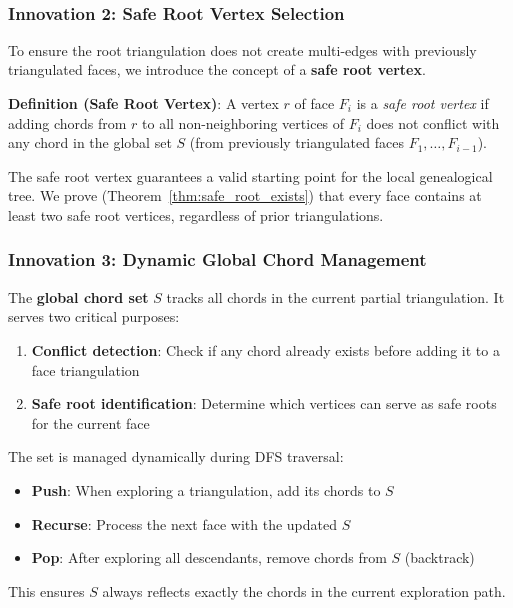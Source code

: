 ﻿﻿\documentclass[12pt,a4paper]{article}
\theoremstyle{definition}
\theoremstyle{remark}
\begin{document}
\subsubsection{Innovation 2: Safe Root Vertex Selection}

To ensure the root triangulation does not create multi-edges with previously triangulated faces, we introduce the concept of a \textbf{safe root vertex}.

\textbf{Definition (Safe Root Vertex)}: A vertex $r$ of face $F_i$ is a \textit{safe root vertex} if adding chords from $r$ to all non-neighboring vertices of $F_i$ does not conflict with any chord in the global set $S$ (from previously triangulated faces $F_1, \ldots, F_{i-1}$).

The safe root vertex guarantees a valid starting point for the local genealogical tree. We prove (Theorem~\ref{thm:safe_root_exists}) that every face contains at least two safe root vertices, regardless of prior triangulations.

\subsubsection{Innovation 3: Dynamic Global Chord Management}

The \textbf{global chord set} $S$ tracks all chords in the current partial triangulation. It serves two critical purposes:

\begin{enumerate}
	\item \textbf{Conflict detection}: Check if any chord already exists before adding it to a face triangulation
	\item \textbf{Safe root identification}: Determine which vertices can serve as safe roots for the current face
\end{enumerate}

The set is managed dynamically during DFS traversal:
\begin{itemize}
	\item \textbf{Push}: When exploring a triangulation, add its chords to $S$
	\item \textbf{Recurse}: Process the next face with the updated $S$
	\item \textbf{Pop}: After exploring all descendants, remove chords from $S$ (backtrack)
\end{itemize}

This ensures $S$ always reflects exactly the chords in the current exploration path.
\end{document}
